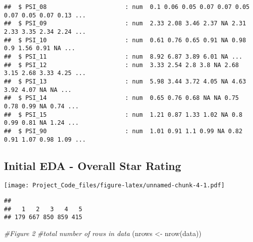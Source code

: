 \documentclass[
]{article}
\newenvironment{Shaded}{\begin{snugshade}}{\end{snugshade}}
\newcommand{\CommentTok}[1]{\textcolor[rgb]{0.56,0.35,0.01}{\textit{#1}}}
\newcommand{\FunctionTok}[1]{\textcolor[rgb]{0.00,0.00,0.00}{#1}}
\newcommand{\NormalTok}[1]{#1}
\newcommand{\OtherTok}[1]{\textcolor[rgb]{0.56,0.35,0.01}{#1}}
\newcommand{\SpecialCharTok}[1]{\textcolor[rgb]{0.00,0.00,0.00}{#1}}
\begin{document}
\begin{verbatim}
##  $ PSI_08                      : num  0.1 0.06 0.05 0.07 0.07 0.05 0.07 0.05 0.07 0.13 ...
##  $ PSI_09                      : num  2.33 2.08 3.46 2.37 NA 2.31 2.33 3.35 2.34 2.24 ...
##  $ PSI_10                      : num  0.61 0.76 0.65 0.91 NA 0.98 0.9 1.56 0.91 NA ...
##  $ PSI_11                      : num  8.92 6.87 3.89 6.01 NA ...
##  $ PSI_12                      : num  3.33 2.54 2.8 3.8 NA 2.68 3.15 2.68 3.33 4.25 ...
##  $ PSI_13                      : num  5.98 3.44 3.72 4.05 NA 4.63 3.92 4.07 NA NA ...
##  $ PSI_14                      : num  0.65 0.76 0.68 NA NA 0.75 0.78 0.99 NA 0.74 ...
##  $ PSI_15                      : num  1.21 0.87 1.33 1.02 NA 0.8 0.99 0.81 NA 1.24 ...
##  $ PSI_90                      : num  1.01 0.91 1.1 0.99 NA 0.82 0.91 1.07 0.98 1.09 ...
\end{verbatim}

\hypertarget{initial-eda---overall-star-rating}{%
\subsection{Initial EDA - Overall Star
Rating}\label{initial-eda---overall-star-rating}}

\begin{Shaded}
\end{Shaded}

\texttt{[image: Project\_Code\_files/figure-latex/unnamed-chunk-4-1.pdf]}

\begin{Shaded}
\end{Shaded}

\begin{verbatim}
## 
##   1   2   3   4   5 
## 179 667 850 859 415
\end{verbatim}

\begin{Shaded}
\begin{Highlighting}[]
\CommentTok{\#Figure 2}
\CommentTok{\#total number of rows in data}
\NormalTok{(nrows }\OtherTok{\textless{}{-}} \FunctionTok{nrow}\NormalTok{(data))}
\end{Highlighting}
\end{Shaded}
\end{document}
